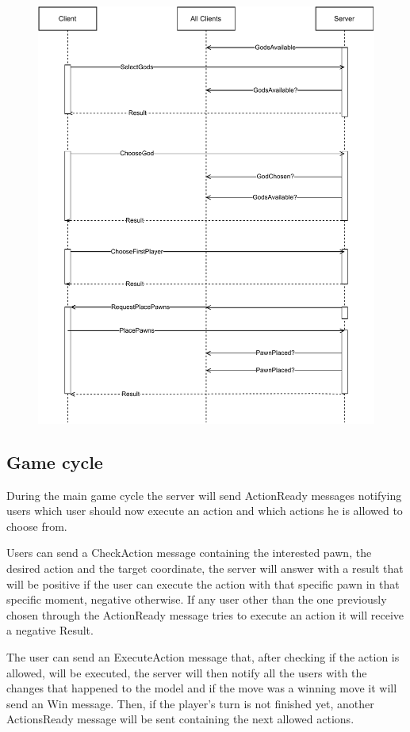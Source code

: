\documentclass{article}
\begin{document}
\begin{figure}[H]
    \centering
    \includegraphics[width=0.85\linewidth]{communication_uml_2.pdf}
\end{figure}
\subsection*{Game cycle}

During the main game cycle the server will send ActionReady messages notifying users which user should now execute an action and which actions he is allowed to choose from. 

Users can send a CheckAction message containing the interested pawn, the desired action and the target coordinate, the server will answer with a result that will be positive if the user can execute the action with that specific pawn in that specific moment, negative otherwise. If any user other than the one previously chosen through the ActionReady message tries to execute an action it will receive a negative Result.

The user can send an ExecuteAction message that, after checking if the action is allowed, will be executed, the server will then notify all the users with the changes that happened to the model and if the move was a winning move it will send an Win message. Then, if the player's turn is not finished yet, another ActionsReady message will be sent containing the next allowed actions.
\end{document}

